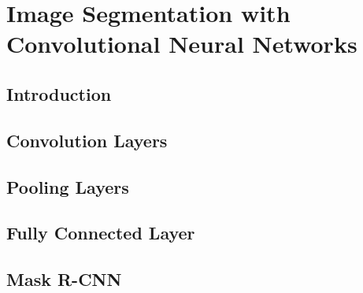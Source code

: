 
\chapter{Image Segmentation with Convolutional Neural Networks}
\section{Introduction}
\section{Convolution Layers}
\section{Pooling Layers}
\section{Fully Connected Layer}
\section{Mask R-CNN}

